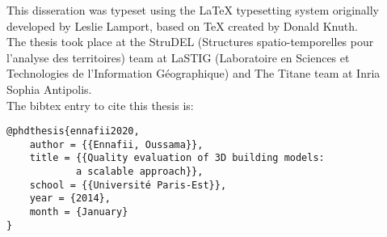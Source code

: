 \begin{colophon}
    This disseration was typeset using the \LaTeX{} typesetting system originally developed by Leslie Lamport, based on \TeX{} created by Donald Knuth.\\

    The thesis took place at the StruDEL (Structures spatio-temporelles pour l’analyse des territoires) team at LaSTIG (Laboratoire en Sciences et Technologies de l'Information Géographique) and The Titane team at Inria Sophia Antipolis.\\

    The bibtex entry to cite this thesis is:
    \begin{verbatim}
@phdthesis{ennafii2020,
    author = {{Ennafii, Oussama}},
    title = {{Quality evaluation of 3D building models:
            a scalable approach}},
    school = {{Université Paris-Est}},
    year = {2014},
    month = {January}
}
    \end{verbatim}
\end{colophon}